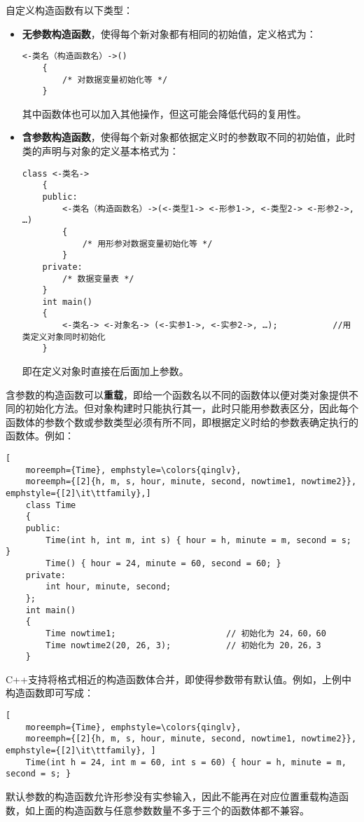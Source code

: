 \documentclass[10pt, a4paper, oneside, fontset=none]{ctexart}
\theoremstyle{plain}
\theoremstyle{definition}
\newcommand{\colors}[1]{\color{#1!75!black}}
\newcommand{\tboba}[1]{\textbf{\kai\color{bali!75!black}#1}}
\begin{document}
自定义构造函数有以下类型：
\begin{itemize}
	\item \tboba{无参数构造函数}，使得每个新对象都有相同的初始值，定义格式为：
	\begin{lstlisting}[style=intro, xleftmargin=1em]
	<-类名（构造函数名）->()
	{
		/* 对数据变量初始化等 */
	}
	\end{lstlisting}
	其中函数体也可以加入其他操作，但这可能会降低代码的复用性。
	\item \tboba{含参数构造函数}，使得每个新对象都依据定义时的参数取不同的初始值，此时类的声明与对象的定义基本格式为：
	\begin{lstlisting}[style=intro, xleftmargin=1em]
	class <-类名->
	{
	public:
		<-类名（构造函数名）->(<-类型1-> <-形参1->, <-类型2-> <-形参2->, …)
		{
			/* 用形参对数据变量初始化等 */
		}
	private:
		/* 数据变量表 */
	}
	int main()
	{
		<-类名-> <-对象名-> (<-实参1->, <-实参2->, …);			//用类定义对象同时初始化
	}
	\end{lstlisting}
	即在定义对象时直接在后面加上参数。
\end{itemize}

含参数的构造函数可以\tboba{重载}，即给一个函数名以不同的函数体以便对类对象提供不同的初始化方法。但对象构建时只能执行其一，此时只能用参数表区分，因此每个函数体的参数个数或参数类型必须有所不同，即根据定义时给的参数表确定执行的函数体。例如：
\begin{lstlisting}[
	moreemph={Time}, emphstyle=\colors{qinglv}, 
	moreemph={[2]{h, m, s, hour, minute, second, nowtime1, nowtime2}}, emphstyle={[2]\it\ttfamily},]
	class Time
	{
	public:
		Time(int h, int m, int s) { hour = h, minute = m, second = s; }
		Time() { hour = 24, minute = 60, second = 60; }
	private:
		int hour, minute, second;
	};
	int main()
	{
		Time nowtime1;                      // 初始化为 24，60，60
		Time nowtime2(20, 26, 3);           // 初始化为 20，26，3
	}
\end{lstlisting}
C++支持将格式相近的构造函数体合并，即使得参数带有默认值。例如，上例中构造函数即可写成：
\begin{lstlisting}[
	moreemph={Time}, emphstyle=\colors{qinglv}, 
	moreemph={[2]{h, m, s, hour, minute, second, nowtime1, nowtime2}}, emphstyle={[2]\it\ttfamily}, ]
	Time(int h = 24, int m = 60, int s = 60) { hour = h, minute = m, second = s; }
\end{lstlisting}
默认参数的构造函数允许形参没有实参输入，因此不能再在对应位置重载构造函数，如上面的构造函数与任意参数数量不多于三个的函数体都不兼容。
\end{document}
